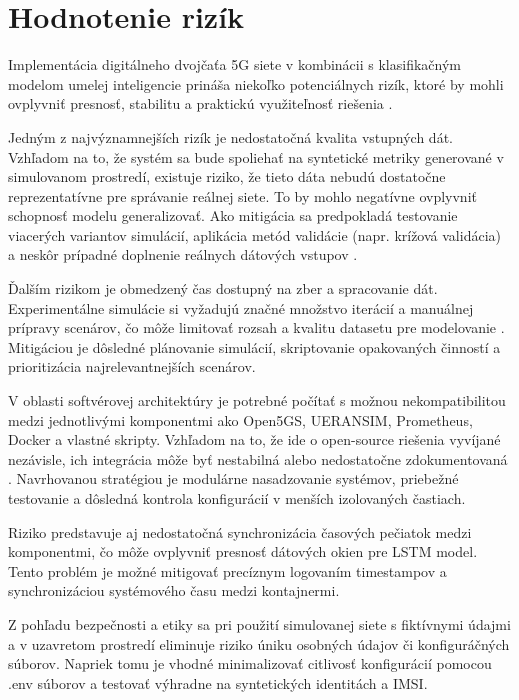 \section{Hodnotenie rizík}
Implementácia digitálneho dvojčaťa 5G siete v kombinácii s klasifikačným modelom umelej inteligencie prináša niekoľko potenciálnych rizík, ktoré by mohli ovplyvniť presnosť, stabilitu a praktickú využiteľnosť riešenia \cite{ML_traffic}.

Jedným z najvýznamnejších rizík je nedostatočná kvalita vstupných dát. Vzhľadom na to, že systém sa bude spoliehať na syntetické metriky generované v simulovanom prostredí, existuje riziko, že tieto dáta nebudú dostatočne reprezentatívne pre správanie reálnej siete. To by mohlo negatívne ovplyvniť schopnosť modelu generalizovať. Ako mitigácia sa predpokladá testovanie viacerých variantov simulácií, aplikácia metód validácie \cite{Nguyen} (napr. krížová validácia) a neskôr prípadné doplnenie reálnych dátových vstupov \cite{data_generating}.

Ďalším rizikom je obmedzený čas dostupný na zber a spracovanie dát. Experimentálne simulácie si vyžadujú značné množstvo iterácií a manuálnej prípravy scenárov, čo môže limitovať rozsah a kvalitu datasetu pre modelovanie \cite{USAirForce}. Mitigáciou je dôsledné plánovanie simulácií, skriptovanie opakovaných činností a prioritizácia najrelevantnejších scenárov.

V oblasti softvérovej architektúry je potrebné počítať s možnou nekompatibilitou medzi jednotlivými komponentmi ako Open5GS, UERANSIM, Prometheus, Docker a vlastné skripty. Vzhľadom na to, že ide o open-source riešenia vyvíjané nezávisle, ich integrácia môže byť nestabilná alebo nedostatočne zdokumentovaná \cite{challenges_human_factor}. Navrhovanou stratégiou je modulárne nasadzovanie systémov, priebežné testovanie a dôsledná kontrola konfigurácií v menších izolovaných častiach.

Riziko predstavuje aj nedostatočná synchronizácia časových pečiatok medzi komponentmi, čo môže ovplyvniť presnosť dátových okien pre LSTM model. Tento problém je možné mitigovať precíznym logovaním timestampov a synchronizáciou systémového času medzi kontajnermi.

Z pohľadu bezpečnosti a etiky sa pri použití simulovanej siete s fiktívnymi údajmi a v uzavretom prostredí eliminuje riziko úniku osobných údajov či konfiguráčných súborov. Napriek tomu je vhodné minimalizovať citlivosť konfigurácií pomocou .env súborov \cite{Dt_Iot_data_worry_about} a testovať výhradne na syntetických identitách a IMSI.
